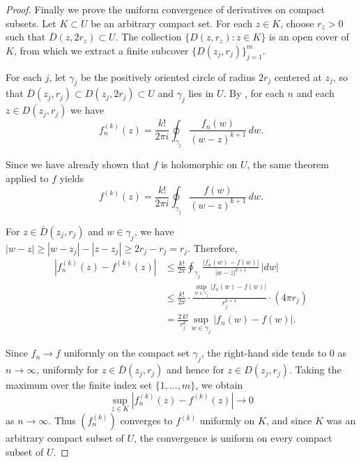 \begin{proof}
    Finally we prove the uniform convergence of derivatives on compact subsets. Let $K \subset U$ be an arbitrary compact set. For each $z \in K$, choose $r_z > 0$ such that $\overline{D}(z, 2r_z) \subset U$. The collection $\{D(z, r_z) : z \in K\}$ is an open cover of $K$, from which we extract a finite subcover $\{D(z_j, r_j)\}_{j=1}^m$.

    For each $j$, let $\gamma_j$ be the positively oriented circle of radius $2r_j$ centered at $z_j$, so that $\overline{D}(z_j, r_j) \subset D(z_j, 2r_j) \subset U$ and $\gamma_j$ lies in $U$. By , for each $n$ and each $z \in D(z_j, r_j)$ we have
    $$f_n^{(k)}(z) = \frac{k!}{2\pi i} \oint_{\gamma_j} \frac{f_n(w)}{(w - z)^{k+1}}\,dw.$$

    Since we have already shown that $f$ is holomorphic on $U$, the same theorem applied to $f$ yields
    $$f^{(k)}(z) = \frac{k!}{2\pi i} \oint_{\gamma_j} \frac{f(w)}{(w - z)^{k+1}}\,dw.$$

    For $z \in \overline{D}(z_j, r_j)$ and $w \in \gamma_j$, we have $|w - z| \ge |w - z_j| - |z - z_j| \ge 2r_j - r_j = r_j$. Therefore,
    \begin{align*}
        |f_n^{(k)}(z) - f^{(k)}(z)|
        &\le \frac{k!}{2\pi} \oint_{\gamma_j} \frac{|f_n(w) - f(w)|}{|w - z|^{k+1}}\,|dw| \\
        &\le \frac{k!}{2\pi} \cdot \frac{\sup_{w \in \gamma_j} |f_n(w) - f(w)|}{r_j^{k+1}} \cdot (4\pi r_j) \\
        &= \frac{2\,k!}{r_j^k} \sup_{w \in \gamma_j} |f_n(w) - f(w)|.
    \end{align*}

    Since $f_n \to f$ uniformly on the compact set $\gamma_j$, the right-hand side tends to $0$ as $n \to \infty$, uniformly for $z \in \overline{D}(z_j, r_j)$ and hence for $z \in D(z_j, r_j)$. Taking the maximum over the finite index set $\{1,\dots,m\}$, we obtain
    $$\sup_{z \in K} |f_n^{(k)}(z) - f^{(k)}(z)| \longrightarrow 0$$
    as $n \to \infty$. Thus $(f_n^{(k)})$ converges to $f^{(k)}$ uniformly on $K$, and since $K$ was an arbitrary compact subset of $U$, the convergence is uniform on every compact subset of $U$.
\end{proof}
